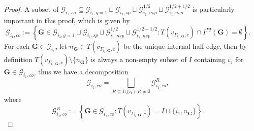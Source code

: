 \documentclass[11pt]{amsart}
\theoremstyle{definition}
\theoremstyle{remark}
\newcommand{\<}{\left<}
\renewcommand{\>}{\right>}
\numberwithin{equation}{section}
\begin{document}
\begin{proof}
        A subset of $\bm{\mathcal G}_{i_1,co}\subseteq \bm{\mathcal G}^{}_{i_1,g=1} \sqcup \bm{\mathcal G}^{}_{i_1,sp} \sqcup \bm{\mathcal G}^{1/2}_{i_1,nsp} \sqcup \bm{\mathcal G}^{1/2+1/2}_{i_1,nsp}$ is particularly important in this proof, which is given by
        \begin{equation*}
            \bm{\mathcal G}_{i_1,co}:=\left\{ \bm{G}\in \bm{\mathcal G}^{}_{i_1,g=1} \sqcup \bm{\mathcal G}^{}_{i_1,sp} \sqcup \bm{\mathcal G}^{1/2}_{i_1,nsp} \sqcup \bm{\mathcal G}^{1/2+1/2}_{i_1,nsp}\colon T(v_{\Gamma_{i_1,\bm{G}},c})\cap I^{PI}(\bm{G})=\emptyset \right\}.
        \end{equation*}
        For each $\bm{G}\in \bm{\mathcal G}_{i_1}$, let $n_{\bm{G}}\in T(v_{\Gamma_{i_1,\bm{G}},c})$ be the unique internal half-edge, then by definition $T(v_{\Gamma_{i_1,\bm{G}},c})\setminus\{n_{\bm{G}}\}$ is always a non-empty subset of $I$ containing $i_1$ for $\bm{G}\in \bm{\mathcal G}_{i_1,co}$, thus we have a decomposition 
        \begin{equation*}
            \bm{\mathcal G}_{i_1,co}= \bigsqcup_{R\subseteq I\setminus \{i_1\}, R\ne \emptyset}\bm{\mathcal G}^R_{i_1,co},
        \end{equation*}
        where 
        \begin{equation*}
            \bm{\mathcal G}^R_{i_1,co}:= \left\{ \bm{G}\in \bm{\mathcal G}_{i_1,co} \colon  T(v_{\Gamma_{i_1,\bm{G}},c})=I\sqcup \{i_1,n_{\bm{G}}\}\right\}.
        \end{equation*}
        
        
        


\end{proof}
\end{document}
